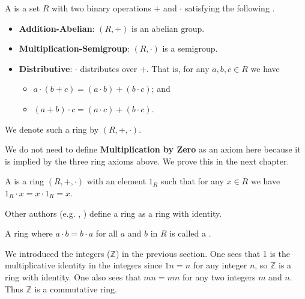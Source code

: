 \begin{definition}
    A  is a set $R$ with two binary operations $+$ and $\cdot$ satisfying the following .
    \begin{itemize}
        \item \textbf{Addition-Abelian}: $(R, +)$ is an abelian group.
        \item \textbf{Multiplication-Semigroup}: $(R, \cdot)$ is a semigroup.
        \item \textbf{Distributive}: $\cdot$ distributes over $+$. That is, for any $a, b, c \in R$ we have
        \begin{itemize}
            \item $a \cdot (b + c) = (a \cdot b) + (b \cdot c)$; and
            \item $(a + b) \cdot c = (a \cdot c) + (b \cdot c)$.
        \end{itemize}
    \end{itemize}
    We denote such a ring by $(R, +, \cdot)$.
\end{definition}
\begin{remark}
    We do not need to define \textbf{Multiplication by Zero} as an axiom here because it is implied by the three ring axioms above. We prove this in the next chapter.
\end{remark}

\begin{definition}
    A  is a ring $(R, +, \cdot)$ with an element $1_R$ such that for any $x \in R$ we have $1_R \cdot x = x \cdot 1_R = x$.
\end{definition}
\begin{remark}
    Other authors (e.g. \cite[p.~136]{cohn_1982}, \cite[pp.~145--146]{clark_1984}) define a ring as a ring with identity.
\end{remark}

\begin{definition}
    A ring where $a \cdot b = b \cdot a$ for all $a$ and $b$ in $R$ is called a .
\end{definition}

\begin{example}
    We introduced the integers ($\mathbb{Z}$) in the previous section. One sees that 1 is the multiplicative identity in the integers since $1n = n$ for any integer $n$, so $\mathbb{Z}$ is a ring with identity. One also sees that $mn = nm$ for any two integers $m$ and $n$. Thus $\mathbb{Z}$ is a commutative ring.
\end{example}

